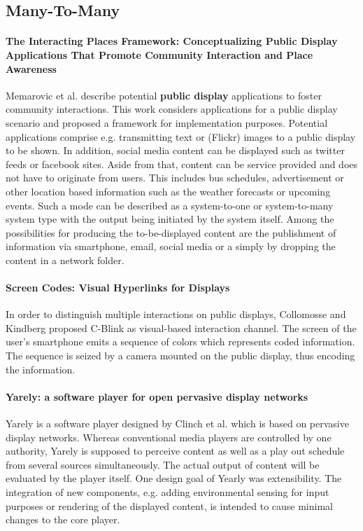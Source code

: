 \subsection{Many-To-Many}

\paragraph{The Interacting Places Framework: Conceptualizing Public Display Applications That Promote Community Interaction and Place Awareness}
Memarovic et al. \cite{memarovic_places} describe potential \textbf{public display} applications to foster community interactions.
This work considers applications for a public display scenario and proposed a framework for implementation purposes.
Potential applications comprise e.g. transmitting text or (Flickr) images to a public display to be shown.
In addition, social media content can be displayed such as twitter feeds or facebook sites.
Aside from that, content can be service provided and does not have to originate from users.
This includes bus schedules, advertisement or other location based information such as the weather forecasts or upcoming events.
Such a mode can be described as a system-to-one or system-to-many system type with the output being initiated by the system itself.
Among the possibilities for producing the to-be-displayed content are the publishment of information via smartphone, email, social media or a simply by dropping the content in a network folder.

\paragraph{Screen Codes: Visual Hyperlinks for Displays}
In order to distinguish multiple interactions on public displays, Collomosse and Kindberg \cite{Collomosse_ScreenCodes} proposed C-Blink as visual-based interaction channel. The screen of the user’s smartphone emits a sequence of colors which represents coded information. The sequence is seized by a camera mounted on the public display, thus encoding the information.

\paragraph{Yarely: a software player for open pervasive display networks}
Yarely is a software player designed by Clinch et al. \cite{Clinch_Yarely} which is based on pervasive display networks. Whereas conventional media players are controlled by one authority, Yarely is supposed to perceive content as well as a play out schedule from several sources simultaneously. The actual output of content will be evaluated by the player itself.
One design goal of Yearly was extensibility. The integration of new components, e.g. adding environmental sensing for input purposes or rendering of the displayed content, is intended to cause minimal changes to the core player.


